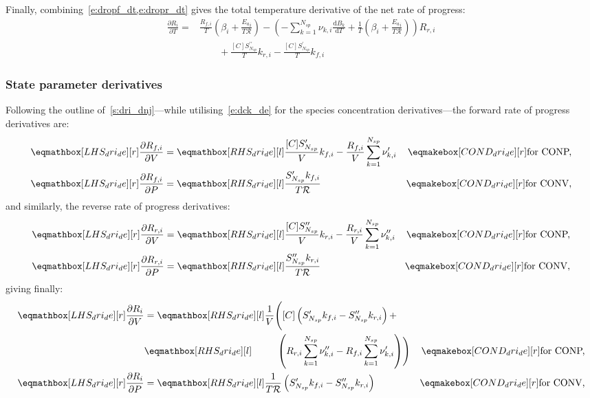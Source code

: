 \documentclass[12pt,number,sort&compress]{elsarticle}
\newcommand{\ns}{N_{sp}}
\newcommand{\conp}{CONP}
\newcommand{\conv}{CONV}
\newcommand{\dconp}{\ifmmode\text{for \conp,}\else for \conp,\fi}
\newcommand{\dconv}{\ifmmode\text{for \conv,}\else for \conv,\fi}
\newcommand{\Ru}{\mathcal{R}}
\begin{document}
Finally, combining~\cref{e:dropf_dt,e:dropr_dt} gives the total temperature derivative of the net rate of progress:
\begin{align}
 \label{e:drop_dT}
 \frac{\partial R_{i}}{\partial T } =& \frac{{R_{f, i}}}{T} \left(\beta_{i} + \frac{{E_{a}}_{i}}{T \Ru}\right) - \left(- \sum_{k=1}^{\ns} \nu_{k,i} \frac{\text{d} B_{k} }{\text{d} T } + \frac{1}{T} \left(\beta_{i} + \frac{{E_{a}}_{i}}{T \Ru}\right)\right) {R_{r, i}} \nonumber \\
				      &\qquad + \frac{[C] S^{\prime\prime}_{\ns}}{T} {k_{r, i}} - \frac{[C] S^{\prime}_{\ns}}{T} {k_{f, i}}
\end{align}

\subsubsection{State parameter derivatives}
\label{s:dri_de}
Following the outline of~\cref{s:dri_dnj}---while utilising~\cref{e:dck_de} for the species concentration derivatives---the forward rate of progress derivatives are:
\begin{subequations}
 \begin{align}
  \lhs{dri_de}{\frac{\partial {R_{f, i}} }{\partial V }} &= \rhs{dri_de}{\frac{[C] S^{\prime}_{\ns}}{V} {k_{f, i}} - \frac{{R_{f, i}}}{V} \sum_{k=1}^{\ns} \nu^{\prime}_{k,i}}&\cond{dri_de}{\dconp}\\
  \lhs{dri_de}{\frac{\partial {R_{f, i}} }{\partial P }} &= \rhs{dri_de}{\frac{S^{\prime}_{\ns} {k_{f, i}}}{T \Ru}}&\cond{dri_de}{\dconv}
 \end{align}
\end{subequations}
and similarly, the reverse rate of progress derivatives:
\begin{subequations}
 \begin{align}
  \lhs{dri_de}{\frac{\partial {R_{r, i}} }{\partial V }} &= \rhs{dri_de}{\frac{[C] S^{\prime\prime}_{\ns}}{V} {k_{r, i}} - \frac{{R_{r, i}}}{V} \sum_{k=1}^{\ns} \nu^{\prime\prime}_{k,i}}&\cond{dri_de}{\dconp}\\
  \lhs{dri_de}{\frac{\partial {R_{r, i}} }{\partial P }} &= \rhs{dri_de}{\frac{S^{\prime\prime}_{\ns} {k_{r, i}}}{T \Ru}}&\cond{dri_de}{\dconv}
 \end{align}
\end{subequations}
giving finally:
\begin{subequations}
 \label{e:dropi_de}
 \begin{align}
  \lhs{dri_de}{\frac{\partial {R}_{i} }{\partial V }} &= \rhs{dri_de}{\frac{1}{V}\Biggl( [C]\left(S^{\prime}_{\ns} {k_{f, i}} - S^{\prime\prime}_{\ns} {k_{r, i}}\right) + } & \nonumber\\
  & \rhs{dri_de}{\mathindent[farth] \left({R_{r, i}} \sum_{k=1}^{\ns} \nu^{\prime\prime}_{k,i} - {R_{f, i}} \sum_{k=1}^{\ns} \nu^{\prime}_{k,i}\right) \Biggr)}&\cond{dri_de}{\dconp}\\
  \lhs{dri_de}{\frac{\partial {R}_{i} }{\partial P }} &= \rhs{dri_de}{\frac{1}{T \Ru} \left(S^{\prime}_{\ns} {k_{f, i}} - S^{\prime\prime}_{\ns} {k_{r, i}}\right)}&\cond{dri_de}{\dconv}
 \end{align}
\end{subequations}
\end{document}
